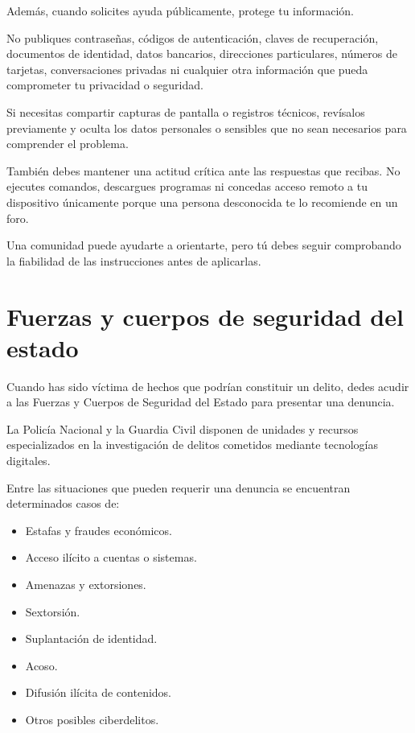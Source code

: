 \documentclass[
  spanish,
  a4paper,
  openany]{book}
\begin{document}
Además, cuando solicites ayuda públicamente, protege tu información.

No publiques contraseñas, códigos de autenticación, claves de recuperación, documentos de identidad, datos bancarios, direcciones particulares, números de tarjetas, conversaciones privadas ni cualquier otra información que pueda comprometer tu privacidad o seguridad.

Si necesitas compartir capturas de pantalla o registros técnicos, revísalos previamente y oculta los datos personales o sensibles que no sean necesarios para comprender el problema.

También debes mantener una actitud crítica ante las respuestas que recibas. No ejecutes comandos, descargues programas ni concedas acceso remoto a tu dispositivo únicamente porque una persona desconocida te lo recomiende en un foro.

Una comunidad puede ayudarte a orientarte, pero tú debes seguir comprobando la fiabilidad de las instrucciones antes de aplicarlas.

\section{Fuerzas y cuerpos de seguridad del estado}\label{fuerzas-y-cuerpos-de-seguridad-del-estado}

Cuando has sido víctima de hechos que podrían constituir un delito, dedes acudir a las Fuerzas y Cuerpos de Seguridad del Estado para presentar una denuncia.

La Policía Nacional y la Guardia Civil disponen de unidades y recursos especializados en la investigación de delitos cometidos mediante tecnologías digitales.

Entre las situaciones que pueden requerir una denuncia se encuentran determinados casos de:

\begin{itemize}
\item
  Estafas y fraudes económicos.
\item
  Acceso ilícito a cuentas o sistemas.
\item
  Amenazas y extorsiones.
\item
  Sextorsión.
\item
  Suplantación de identidad.
\item
  Acoso.
\item
  Difusión ilícita de contenidos.
\item
  Otros posibles ciberdelitos.
\end{itemize}
\end{document}
